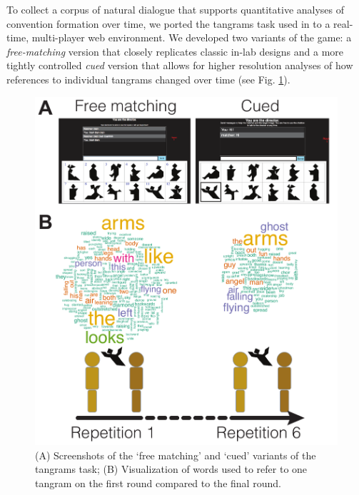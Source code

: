 \documentclass[alpha-refs]{wiley-article}
\begin{document}
To collect a corpus of natural dialogue that supports quantitative analyses of convention formation over time, we ported the tangrams task used in \cite{ClarkWilkesGibbs86_ReferringCollaborative} to a real-time, multi-player web environment. 
We developed two variants of the game: a \emph{free-matching} version that closely replicates classic in-lab designs and a more tightly controlled \emph{cued} version that allows for higher resolution analyses of how references to individual tangrams changed over time (see Fig. \ref{fig:design}). 

\begin{figure}
\includegraphics[scale=.65]{designAndExample.pdf}
\caption{(A) Screenshots of the `free matching' and `cued' variants of the tangrams task; (B) Visualization of words used to refer to one tangram on the first round compared to the final round. }
\label{fig:design}
\end{figure}
\end{document}
